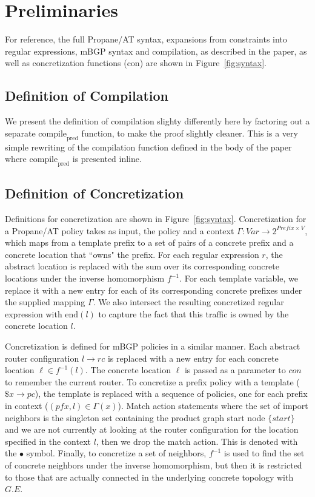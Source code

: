 \documentclass[twocolumn, openany]{sig-alternate-10pt}
\newcommand{\sysname}{{\small \sf Propane/AT}\xspace}
\newcommand{\Con}{\mathrm{con}}
\newcommand{\CompilePred}{\ensuremath{\mathrm{compile}_\mathrm{pred}}}
\begin{document}
\section{Preliminaries}

For reference, the full \sysname syntax, expansions from constraints into regular expressions, mBGP syntax and compilation, as described in the paper, as well as concretization functions ($\Con$) are shown in Figure~\ref{fig:syntax}.

\subsection{Definition of Compilation}

We present the definition of compilation slighty differently here by factoring out a separate $\CompilePred$ function, to make the proof slightly cleaner. This is a very simple rewriting of the compilation function defined in the body of the paper where $\CompilePred$ is presented inline.

\subsection{Definition of Concretization}

Definitions for concretization are shown in Figure~\ref{fig:syntax}. Concretization for a \sysname policy takes as input, the policy and a context
$\Gamma : Var \rightarrow 2^{Prefix \times V}$,
which maps from a template prefix to a set of pairs of a concrete prefix and a concrete location that ``owns" the prefix.
%
For each regular expression $r$, the abstract location is replaced with the sum over its corresponding concrete locations under the inverse homomorphism $f^{-1}$. For each template variable, we replace it with a new entry for each of its corresponding concrete prefixes under the supplied mapping $\Gamma$. We also intersect the resulting concretized regular expression with $\text{end}(l)$ to capture the fact that this traffic is owned by the concrete location $l$.%

Concretization is defined for mBGP policies in a similar manner. Each abstract router configuration $l \rightarrow rc$ is replaced with a new entry for each concrete location $\ell \in f^{-1}(l)$. The concrete location $\ell$ is passed as a parameter to $con$ to remember the current router.
%
To concretize a prefix policy with a template ($\$x \rightarrow pc$), the template is replaced with a sequence of policies, one for each prefix in context ($(pfx,l) \in \Gamma(x)$). Match action statements where the set of import neighbors is the singleton set containing the product graph start node $\{ start \}$ and we are not currently at looking at the router configuration for the location specified in the context $l$, then we drop the match action. This is denoted with the $\bullet$ symbol. Finally, to concretize a set of neighbors, $f^{-1}$ is used to find the set of concrete neighbors under the inverse homomorphism, but then it is restricted to those that are actually connected in the underlying concrete topology with $G.E$.
\end{document}
